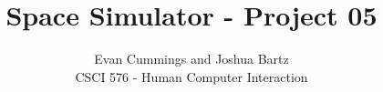 
\DeclareMathOperator*{\argmax}{arg\,max}


\small

\title{Space Simulator - Project 05}
\author{Evan Cummings and Joshua Bartz\\
CSCI 576 - Human Computer Interaction}

\maketitle





